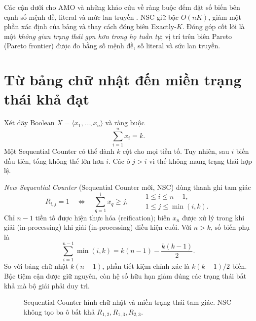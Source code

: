 Các cận dưới cho AMO và những khảo cứu về ràng buộc đếm đặt số biến bên cạnh
số mệnh đề, literal và mức lan truyền
\parencite{kucera2019lower,bailleux2010survey}. NSC giữ bậc \(O(nK)\), giảm
một phần xác định của bảng và thay cách đóng biên Exactly-\(K\). Đóng góp cốt
lõi là một \emph{không gian trạng thái gọn hơn trong họ tuần tự}; vị trí trên
biên Pareto (Pareto frontier) được đo bằng số mệnh đề, số literal và sức lan truyền.

\section{Từ bảng chữ nhật đến miền trạng thái khả đạt}

Xét dãy Boolean \(X=\langle x_1,\ldots,x_n\rangle\) và ràng buộc
\[
  \sum_{i=1}^{n}x_i=k.
\]
Một Sequential Counter có thể dành \(k\) cột cho mọi tiền tố. Tuy nhiên, sau
\(i\) biến đầu tiên, tổng không thể lớn hơn \(i\). Các ô \(j>i\) vì thế không
mang trạng thái hợp lệ.

\emph{New Sequential Counter} (Sequential Counter mới, NSC) dùng thanh ghi tam giác
\[
  R_{i,j}=1
  \quad\Longleftrightarrow\quad
  \sum_{q=1}^{i}x_q\ge j,
  \qquad
  \begin{matrix}
    1\le i\le n-1,\\[-1mm]
    1\le j\le \min(i,k).
  \end{matrix}
\]
Chỉ \(n-1\) tiền tố được hiện thực hóa (reification); biến \(x_n\) được xử lý trong khi giải (in-processing) khi giải (in-processing) điều kiện cuối.
Với \(n>k\), số biến phụ là
\[
  \sum_{i=1}^{n-1}\min(i,k)
  =
  k(n-1)-\frac{k(k-1)}{2}.
\]
So với bảng chữ nhật \(k(n-1)\), phần tiết kiệm chính xác là
\(k(k-1)/2\) biến. Bậc tiệm cận được giữ nguyên, còn hệ số hữu hạn giảm đúng các
trạng thái bất khả mà bộ giải phải duy trì.

\begin{figure}[tb]
\centering
{}
\caption{Sequential Counter hình chữ nhật và miền trạng thái tam giác. NSC không
tạo ba ô bất khả \(R_{1,2},R_{1,3},R_{2,3}\).}
\label{fig:nsc-triangular-domain}
\end{figure}

